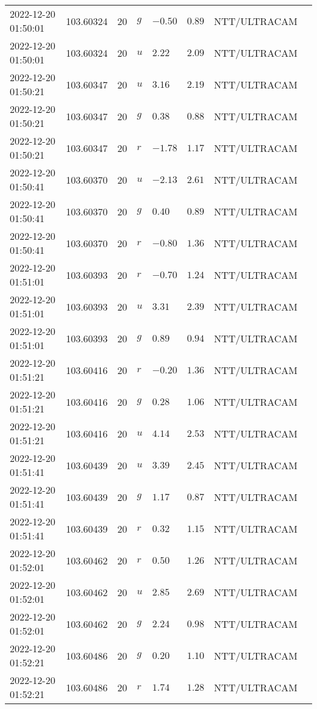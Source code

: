 \documentclass{nature_plusfigure}
\begin{document}
\begin{supplement}
\begin{center}
\begin{longtable}{llllllll}
2022-12-20 01:50:01 & 103.60324 & 20 & $g$ & $-0.50$ & $0.89$ & NTT/ULTRACAM &  \\ 
2022-12-20 01:50:01 & 103.60324 & 20 & $u$ & $2.22$ & $2.09$ & NTT/ULTRACAM &  \\ 
2022-12-20 01:50:21 & 103.60347 & 20 & $u$ & $3.16$ & $2.19$ & NTT/ULTRACAM &  \\ 
2022-12-20 01:50:21 & 103.60347 & 20 & $g$ & $0.38$ & $0.88$ & NTT/ULTRACAM &  \\ 
2022-12-20 01:50:21 & 103.60347 & 20 & $r$ & $-1.78$ & $1.17$ & NTT/ULTRACAM &  \\ 
2022-12-20 01:50:41 & 103.60370 & 20 & $u$ & $-2.13$ & $2.61$ & NTT/ULTRACAM &  \\ 
2022-12-20 01:50:41 & 103.60370 & 20 & $g$ & $0.40$ & $0.89$ & NTT/ULTRACAM &  \\ 
2022-12-20 01:50:41 & 103.60370 & 20 & $r$ & $-0.80$ & $1.36$ & NTT/ULTRACAM &  \\ 
2022-12-20 01:51:01 & 103.60393 & 20 & $r$ & $-0.70$ & $1.24$ & NTT/ULTRACAM &  \\ 
2022-12-20 01:51:01 & 103.60393 & 20 & $u$ & $3.31$ & $2.39$ & NTT/ULTRACAM &  \\ 
2022-12-20 01:51:01 & 103.60393 & 20 & $g$ & $0.89$ & $0.94$ & NTT/ULTRACAM &  \\ 
2022-12-20 01:51:21 & 103.60416 & 20 & $r$ & $-0.20$ & $1.36$ & NTT/ULTRACAM &  \\ 
2022-12-20 01:51:21 & 103.60416 & 20 & $g$ & $0.28$ & $1.06$ & NTT/ULTRACAM &  \\ 
2022-12-20 01:51:21 & 103.60416 & 20 & $u$ & $4.14$ & $2.53$ & NTT/ULTRACAM &  \\ 
2022-12-20 01:51:41 & 103.60439 & 20 & $u$ & $3.39$ & $2.45$ & NTT/ULTRACAM &  \\ 
2022-12-20 01:51:41 & 103.60439 & 20 & $g$ & $1.17$ & $0.87$ & NTT/ULTRACAM &  \\ 
2022-12-20 01:51:41 & 103.60439 & 20 & $r$ & $0.32$ & $1.15$ & NTT/ULTRACAM &  \\ 
2022-12-20 01:52:01 & 103.60462 & 20 & $r$ & $0.50$ & $1.26$ & NTT/ULTRACAM &  \\ 
2022-12-20 01:52:01 & 103.60462 & 20 & $u$ & $2.85$ & $2.69$ & NTT/ULTRACAM &  \\ 
2022-12-20 01:52:01 & 103.60462 & 20 & $g$ & $2.24$ & $0.98$ & NTT/ULTRACAM &  \\ 
2022-12-20 01:52:21 & 103.60486 & 20 & $g$ & $0.20$ & $1.10$ & NTT/ULTRACAM &  \\ 
2022-12-20 01:52:21 & 103.60486 & 20 & $r$ & $1.74$ & $1.28$ & NTT/ULTRACAM &  \\ 

\end{longtable}
\end{center}
\end{supplement}
\end{document}
